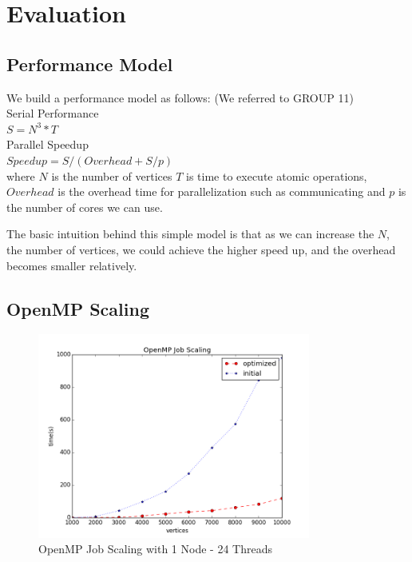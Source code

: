 \section{Evaluation}\label{sec:evaluation}
\subsection{Performance Model}
We build a performance model as follows: (We referred to GROUP 11)\\

Serial Performance \\
$S = N^3 * T$\\

Parallel Speedup \\
$ Speedup = S / ( Overhead + S / p ) $\\

where $N$ is the number of vertices $T$ is time to execute atomic operations,
$Overhead$ is the overhead time for parallelization such as communicating and
$p$ is the number of cores we can use.

The basic intuition behind this simple model is that as we can increase the
$N$, the number of vertices, we could achieve the higher speed up, and the
overhead becomes smaller relatively. 

\subsection{OpenMP Scaling}

\begin{figure}[H]
    \centering
    \includegraphics[width=0.8\textwidth]{figs/MPI_job_scaling.png}
    \caption{OpenMP Job Scaling with 1 Node - 24 Threads}
\end{figure}

